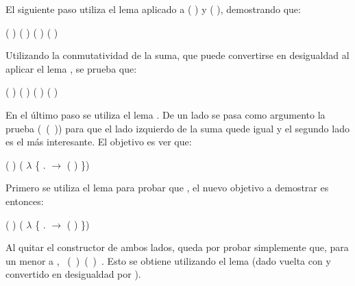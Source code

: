 \begin{AgdaAlign}
El siguiente paso utiliza el lema  aplicado a ( ) y ( ), demostrando que:
\begin{center}
\AgdaFunction{[}  \AgdaFunction{]}  ( ) ( ) \AgdaFunction{$\leq$}  ( ) \AgdaFunction{+} ( )
\end{center}

Utilizando la conmutatividad de la suma, que puede convertirse en desigualdad al aplicar el lema \AgdaFunction{$\sim\rightarrow\leq$}, se prueba que:
\begin{center}
\AgdaFunction{[}  \AgdaFunction{]}  ( ) \AgdaFunction{+} ( ) \AgdaFunction{$\leq$}  ( ) \AgdaFunction{+} ( )
\end{center}

En el último paso se utiliza el lema . De un lado se pasa como argumento la prueba \hbox{( ( ))} para que el lado izquierdo de la suma quede igual y el segundo lado es el más interesante. El objetivo es ver que: 
\begin{center}
\AgdaFunction{[}  \AgdaFunction{]}  ( ) \AgdaFunction{$\leq$} ( $\lambda$ \{ . $\rightarrow$  ( )  \})
\end{center}

Primero se utiliza el lema  para probar que \AgdaFunction{[}  \AgdaFunction{]}   \AgdaFunction{$\leq$}  , el nuevo objetivo a demostrar es entonces:
\begin{center}
\AgdaFunction{[}  \AgdaFunction{]}  ( ) \AgdaFunction{$\leq$} ( $\lambda$ \{ . $\rightarrow$  ( )  \})
\end{center}

Al quitar el constructor  de ambos lados, queda por probar simplemente que, para un  menor a , \hbox{\AgdaFunction{[}  \AgdaFunction{]} ( ) \AgdaFunction{$\leq$}  ( ) }. Esto se obtiene utilizando el lema  (dado vuelta con  y convertido en desigualdad por \AgdaFunction{$\sim\rightarrow\leq$}).


\end{AgdaAlign}
